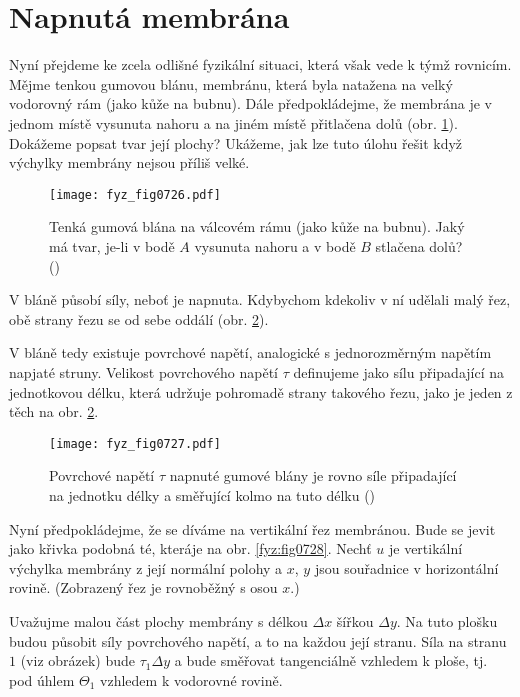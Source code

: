   \section{Napnutá membrána}\label{fyz:IIchapXIIsecIII}
    Nyní přejdeme ke zcela odlišné fyzikální situaci, která však vede k týmž rovnicím. Mějme tenkou
    gumovou blánu, membránu, která byla natažena na velký vodorovný rám (jako kůže na bubnu). Dále
    předpokládejme, že membrána je v jednom místě vysunuta nahoru a na jiném místě přitlačena dolů
    (obr. \ref{fyz:fig0726}). Dokážeme popsat tvar její plochy? Ukážeme, jak lze tuto úlohu řešit
    když výchylky membrány nejsou příliš velké.

    \begin{figure}[ht!] %
      \centering
      \texttt{[image: fyz\_fig0726.pdf]}
      \caption{Tenká gumová blána na válcovém rámu (jako kůže na bubnu). Jaký má tvar, je-li v bodě
        \(A\) vysunuta nahoru a v bodě \(B\) stlačena dolů? (\cite[s.~211]{Feynman02})}
      \label{fyz:fig0726}
    \end{figure}

    V bláně působí síly, neboť je napnuta. Kdybychom kdekoliv v ní udělali malý řez, obě strany 
    řezu se od sebe oddálí (obr. \ref{fyz:fig0727}).

    V bláně tedy existuje povrchové napětí, analogické s jednorozměrným napětím napjaté struny.
    Velikost povrchového napětí \(\tau\) definujeme jako sílu připadající na jednotkovou délku,
    která udržuje pohromadě strany takového řezu, jako je jeden z těch na obr. \ref{fyz:fig0727}.

    \begin{figure}[ht!] %
      \centering
      \texttt{[image: fyz\_fig0727.pdf]}
      \caption{Povrchové napětí \(\tau\) napnuté gumové blány je rovno síle připadající na jednotku
        délky a směřující kolmo na tuto délku (\cite[s.~211]{Feynman02})}
      \label{fyz:fig0727}
    \end{figure}

    Nyní předpokládejme, že se díváme na vertikální řez membránou. Bude se jevit jako křivka podobná
    té, kteráje na obr. \ref{fyz:fig0728}. Nechť \(u\) je vertikální výchylka membrány z její
    normální polohy a \(x\), \(y\) jsou souřadnice v horizontální rovině. (Zobrazený řez je
    rovnoběžný s osou \(x\).)

    Uvažujme malou část plochy membrány s délkou \(\Delta x\) šířkou \(\Delta y\). Na tuto plošku
    budou působit síly povrchového napětí, a to na každou její stranu. Síla na stranu \(1\) (viz
    obrázek) bude \(\tau_1\Delta y\) a bude směřovat tangenciálně vzhledem k ploše, tj. pod úhlem
    \(\Theta_1\) vzhledem k vodorovné rovině.

